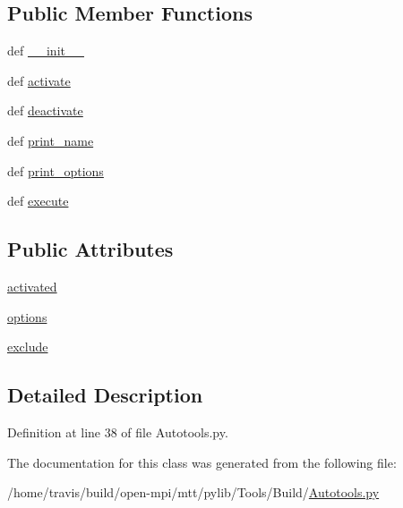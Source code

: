 \subsection*{Public Member Functions}
\begin{DoxyCompactItemize}
\item 
def \hyperlink{group___tools_ga5b5ac092ad7f4bc45bf785633c8be95a}{\-\_\-\-\_\-init\-\_\-\-\_\-}
\item 
def \hyperlink{group___tools_ga202b0e727db575d20a381cd039dd3597}{activate}
\item 
def \hyperlink{group___tools_ga74513a2f4135b506e66c047559f9571e}{deactivate}
\item 
def \hyperlink{group___tools_ga0873459245ef2255a5a7386957fa592e}{print\-\_\-name}
\item 
def \hyperlink{group___tools_ga41481e9f2a7e7fce32f51cc8feb909fd}{print\-\_\-options}
\item 
def \hyperlink{group___tools_ga5ae85e70e9e6252f4be23ef60624f633}{execute}
\end{DoxyCompactItemize}
\subsection*{Public Attributes}
\begin{DoxyCompactItemize}
\item 
\hyperlink{group___tools_ga6bbb714a91bc8b6fe749326772b073b3}{activated}
\item 
\hyperlink{group___tools_ga8b348e19f0a7104bde9c43c3a6ed695d}{options}
\item 
\hyperlink{group___tools_gaee37d9789ea22ee310ebc357cd721b7f}{exclude}
\end{DoxyCompactItemize}


\subsection{Detailed Description}


Definition at line 38 of file Autotools.\-py.



The documentation for this class was generated from the following file\-:\begin{DoxyCompactItemize}
\item 
/home/travis/build/open-\/mpi/mtt/pylib/\-Tools/\-Build/\hyperlink{_autotools_8py}{Autotools.\-py}\end{DoxyCompactItemize}
